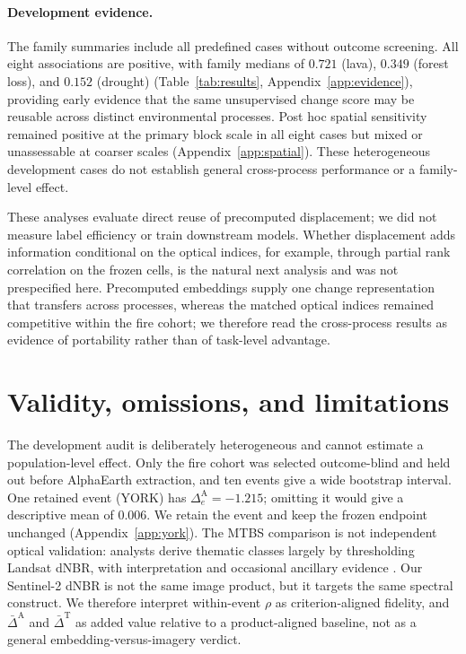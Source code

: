 \documentclass{article}
\begin{document}
\paragraph{Development evidence.}
The family summaries include all predefined cases without outcome screening.
All eight associations are positive, with family medians of $0.721$ (lava),
$0.349$ (forest loss), and $0.152$ (drought)
(Table~\ref{tab:results}, Appendix~\ref{app:evidence}), providing early
evidence that the same unsupervised change score may be reusable across
distinct environmental processes. Post hoc spatial sensitivity remained
positive at the primary block scale in all eight cases but mixed or
unassessable at coarser scales (Appendix~\ref{app:spatial}). These
heterogeneous development cases do not establish general cross-process
performance or a family-level effect.

These analyses evaluate direct reuse of precomputed displacement; we did not
measure label efficiency or train downstream models. Whether displacement adds
information conditional on the optical indices, for example, through partial
rank correlation on the frozen cells, is the natural next analysis and was not
prespecified here. Precomputed embeddings supply one change representation
that transfers across processes, whereas the matched optical indices remained
competitive within the fire cohort; we therefore read the cross-process
results as evidence of portability rather than of task-level advantage.

\section{Validity, omissions, and limitations}

The development audit is deliberately heterogeneous and cannot estimate a
population-level effect. Only the fire cohort was selected outcome-blind and
held out before AlphaEarth extraction, and ten events give a wide bootstrap
interval. One retained event (YORK) has
$\Delta_e^{\mathrm{A}}=-1.215$; omitting it would give a descriptive mean of
$0.006$. We retain the event and keep the frozen endpoint unchanged
(Appendix~\ref{app:york}). The MTBS comparison is not independent optical
validation: analysts derive thematic classes largely by thresholding Landsat
dNBR, with interpretation and occasional ancillary evidence
\citep{eidenshink2007mtbs}. Our Sentinel-2 dNBR is not the same image product,
but it targets the same spectral construct. We therefore interpret
within-event $\rho$ as criterion-aligned fidelity, and
$\bar{\Delta}^{\mathrm{A}}$ and $\bar{\Delta}^{\mathrm{T}}$ as added value
relative to a product-aligned baseline, not as a general
embedding-versus-imagery verdict.
\end{document}
